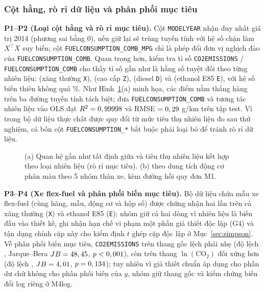 \subsubsection{Cột hằng, rò rỉ dữ liệu và phân phối mục tiêu}
\label{sec:leakage}
\textbf{P1--P2 (Loại cột hằng và rò rỉ mục tiêu).} Cột \texttt{MODELYEAR} nhận duy nhất giá trị 2014 (phương sai bằng 0), nếu giữ lại sẽ trùng tuyến tính với hệ số chặn làm $X^\top X$ suy biến; cột \texttt{FUELCONSUMPTION\_\allowbreak COMB\_MPG} chỉ là phép đổi đơn vị nghịch đảo của \texttt{FUELCONSUMPTION\_COMB}. Quan trọng hơn, kiểm tra tỉ số \texttt{CO2EMISSIONS} / \texttt{FUELCONSUMPTION\_COMB} cho thấy tỉ số gần như là hằng số tuyệt đối theo từng nhiên liệu: \ratioX{} (xăng thường \texttt{X}), \ratioZ{} (cao cấp \texttt{Z}), \ratioD{} (diesel \texttt{D}) và \ratioE{} (ethanol E85 \texttt{E}), với hệ số biến thiên không quá \ratioCvMax\%. Như Hình~\ref{fig:leak-eda}(a) minh họa, các điểm nằm thẳng hàng trên ba đường tuyến tính tách biệt; đưa \texttt{FUELCONSUMPTION\_COMB} và tương tác nhiên liệu vào OLS đạt $R^2 = 0,99998$ và RMSE $= 0,29$ g/km trên tập test. Vì \COtwo{} trong bộ dữ liệu thực chất được quy đổi từ mức tiêu thụ nhiên liệu đo sau thử nghiệm, cả bốn cột \texttt{FUELCONSUMPTION\_*} bắt buộc phải loại bỏ để tránh rò rỉ dữ liệu.

\begin{figure}[htbp]
  \centering
  
  \caption{(a) Quan hệ gần như tất định giữa \COtwo{} và tiêu thụ nhiên liệu kết hợp theo loại nhiên liệu (rò rỉ mục tiêu). (b) \COtwo{} theo dung tích động cơ phân màu theo 5 nhóm thân xe, kèm đường hồi quy đơn M1.}
  \label{fig:leak-eda}
\end{figure}

\textbf{P3--P4 (Xe flex-fuel và phân phối biến mục tiêu).} Bộ dữ liệu chứa \nPairs{} mẫu xe flex-fuel (cùng hãng, mẫu, động cơ và hộp số) được chứng nhận hai lần trên cả xăng thường (\texttt{X}) và ethanol E85 (\texttt{E}); nhóm giữ cả hai dòng vì nhiên liệu là biến đầu vào thiết kế, ghi nhận hạn chế vi phạm một phần giả thiết độc lập (G4) và tận dụng chính \nPairs{} cặp này cho kiểm định $t$ ghép cặp độc lập ở Mục~\ref{sec:simpson}. Về phân phối biến mục tiêu, \texttt{CO2EMISSIONS} trên thang gốc lệch phải nhẹ (độ lệch \coSkew{}, Jarque--Bera $JB = 48,45$, $p < 0,001$), còn trên thang $\ln(\text{CO}_2)$ đối xứng hơn (độ lệch \logSkew{}, $JB = 4,01$, $p = 0,134$); tuy nhiên vì giả thiết chuẩn áp dụng cho phần dư chứ không cho phân phối biên của $y$, nhóm giữ thang gốc và kiểm chứng biến đổi log riêng ở M4log.

